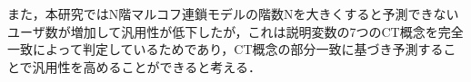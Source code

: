 \documentclass[submit]{ipsj}
\begin{document}
また，本研究ではN階マルコフ連鎖モデルの階数Nを大きくすると予測できないユーザ数が増加して汎用性が低下したが，これは説明変数の7つのCT概念を完全一致によって判定しているためであり，CT概念の部分一致に基づき予測することで汎用性を高めることができると考える．

 
\end{document}
